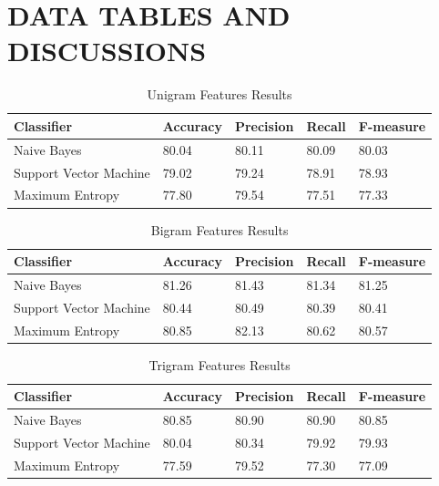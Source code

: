 \documentclass[oneside,a4paper,12pt]{pictreport}
\begin{document}
\chapter{DATA TABLES AND DISCUSSIONS} 


\begin{table}[h!]
\centering
\caption{Unigram Features Results}
\label{my-label}
\begin{tabular}{|l|l|l|l|l|}
\hline
\textbf{Classifier} & \textbf{Accuracy} & \textbf{Precision} & \textbf{Recall} & \textbf{F-measure}\\ \hline
Naive Bayes          & 80.04  & 80.11 & 80.09 & 80.03                   \\ \hline
Support Vector Machine          & 79.02  & 79.24 & 78.91 & 78.93                   \\ \hline
Maximum Entropy          & 77.80  & 79.54 & 77.51 & 77.33 \\ \hline
\end{tabular}
\end{table}



\begin{table}[h!]
\centering
\caption{Bigram Features Results}
\label{my-label}
\begin{tabular}{|l|l|l|l|l|}
\hline
\textbf{Classifier} & \textbf{Accuracy} & \textbf{Precision} & \textbf{Recall} & \textbf{F-measure}\\ \hline
Naive Bayes          & 81.26  & 81.43 & 81.34 & 81.25                   \\ \hline
Support Vector Machine          & 80.44  & 80.49 & 80.39 & 80.41                   \\ \hline
Maximum Entropy          & 80.85  & 82.13 & 80.62 & 80.57 \\ \hline
\end{tabular}
\end{table}





\begin{table}[h!]
\centering
\caption{Trigram Features Results}
\label{my-label}
\begin{tabular}{|l|l|l|l|l|}
\hline
\textbf{Classifier} & \textbf{Accuracy} & \textbf{Precision} & \textbf{Recall} & \textbf{F-measure}\\ \hline
Naive Bayes          & 80.85  & 80.90 & 80.90 & 80.85                   \\ \hline
Support Vector Machine          & 80.04  & 80.34 & 79.92 & 79.93                   \\ \hline
Maximum Entropy          & 77.59  & 79.52 & 77.30 & 77.09 \\ \hline
\end{tabular}
\end{table}
\end{document}
